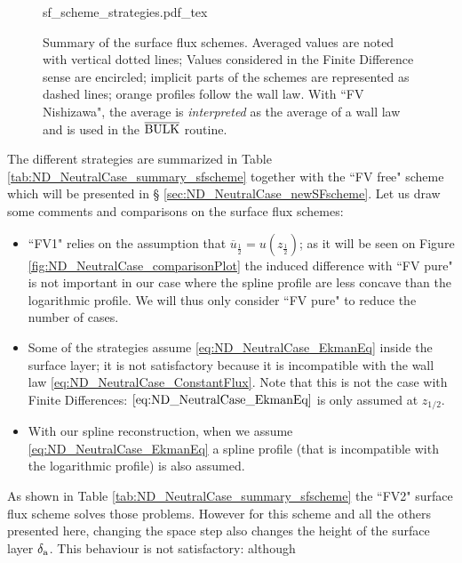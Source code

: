 \begin{figure}
	\centering
	{sf_scheme_strategies.pdf_tex}
	\caption{Summary of the surface flux schemes.
	Averaged values are noted with vertical dotted lines;
	Values considered in the Finite Difference
	sense are encircled; implicit parts of the schemes
	are represented as dashed lines; orange profiles
	follow the wall law.
	With ``FV Nishizawa", the average is \textit{interpreted}
	as the average of a wall law and is used in the
	$\overline{\rm BULK}$ routine.
	}
	\label{fig:ND_NeutralCase_summary_sfscheme}
\end{figure}
The different strategies are summarized in Table
\ref{tab:ND_NeutralCase_summary_sfscheme} together with the
``FV free" scheme which will be presented in \S
\ref{sec:ND_NeutralCase_newSFscheme}.
Let us draw some comments and comparisons on the surface flux schemes:
\begin{itemize}
	\item ``FV1" relies on the assumption that
		$\overline{u}_{\frac{1}{2}} = u(z_{\frac{1}{2}})$;
		as it will be seen on Figure
		\ref{fig:ND_NeutralCase_comparisonPlot} the
		induced difference with ``FV pure" is not important
		in our case where the spline profile are less concave
		than the logarithmic profile.
		We will thus only consider ``FV pure" to
		reduce the number of cases.
	\item Some of the strategies assume
		\eqref{eq:ND_NeutralCase_EkmanEq} inside the surface
		layer; it is not satisfactory because it is
		incompatible with the wall law
		\eqref{eq:ND_NeutralCase_ConstantFlux}.
		Note that this is not
		the case with Finite Differences:
		$\eqref{eq:ND_NeutralCase_EkmanEq}$ is only assumed
		at $z_{1/2}$.
	\item With our spline reconstruction, when we assume
		\eqref{eq:ND_NeutralCase_EkmanEq} a spline
		profile (that is incompatible
		with the logarithmic profile) is also assumed.
\end{itemize}
As shown in Table \ref{tab:ND_NeutralCase_summary_sfscheme}
the ``FV2" surface flux scheme solves those problems.
However for this scheme and all the others presented here,
changing the space step
also changes the height of the surface layer $\delta_{\rm a}$.
This behaviour is not satisfactory: although
